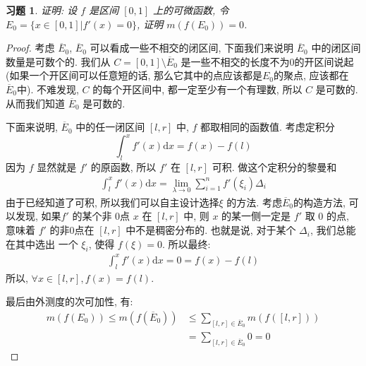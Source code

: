 \documentclass{article}
\newtheorem{exercise}{习题}
\begin{document}
\clearpage
\begin{exercise}
  证明: 设  $f$ 是区间 $[0, 1]$ 上的可微函数, 令 $E_0 = \{x\in [0, 1] | f'(x) = 0\}$, 证明 $m(f(E_0)) = 0$.
\end{exercise}
\begin{proof}
  考虑 $\overline{E}_0$, $\overline{E}_0$ 可以看成一些不相交的闭区间, 下面我们来说明 $\overline{E}_0$ 中的闭区间数量是可数个的. 我们从 $C = [0,1] \setminus \overline{E}_0$ 是一些不相交的长度不为$0$的开区间说起(如果一个开区间可以任意短的话, 那么它其中的点应该都是$E_0$的聚点, 应该都在 $\overline{E}_0$中). 不难发现, $C$ 的每个开区间中, 都一定至少有一个有理数, 所以 $C$ 是可数的. 从而我们知道 $\overline{E}_0$ 是可数的.

  下面来说明, $\overline{E}_0$ 中的任一闭区间 $[l, r]$ 中, $f$ 都取相同的函数值.
  考虑定积分
  \[\int_{l}^x f'(x)\mathrm{d}x = f(x) - f(l)\]
  因为 $f$ 显然就是 $f'$ 的原函数, 所以 $f'$ 在 $[l, r]$ 可积.
  做这个定积分的黎曼和
  \begin{align*}
    \int_l^xf'(x)\mathrm{d}x = \lim_{\lambda\to 0} \sum_{i=1}^n f'(\xi_i)\Delta_i
  \end{align*}
  由于已经知道了可积, 所以我们可以自主设计选择$\xi$ 的方法.
  考虑$\overline{E}_0$的构造方法, 可以发现, 如果$f'$ 的某个非 0点 $x$ 在 $[l, r]$ 中,
  则 $x$ 的某一侧一定是 $f'$ 取 0 的点, 意味着 $f'$ 的非0点在 $[l, r]$ 中不是稠密分布的.
  也就是说, 对于某个 $\Delta_i$, 我们总能在其中选出 一个 $\xi_i$, 使得 $f(\xi) = 0$. 所以最终:
  \begin{align*}
    \int_l^xf'(x)\mathrm{d}x = 0 = f(x) - f(l)
  \end{align*}
  所以, $\forall x\in[l, r], f(x) = f(l)$.

  最后由外测度的次可加性, 有:
  \begin{align*}
    m(f(E_0)) \leq m(f(\overline{E}_0)) &\leq \sum_{[l,r]\in \overline{E}_0} m(f([l, r])) \\
    &= \sum_{[l, r]\in \overline{E}_0} 0 = 0
  \end{align*}
\end{proof}
\end{document}
